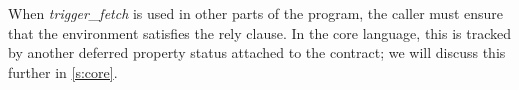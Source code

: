 When \emph{trigger_fetch} is used in other parts of the program, the caller must ensure that the environment satisfies the rely clause.
In the core language, this is tracked by another deferred property status attached to the contract; we will discuss this further in \autoref{s:core}.
